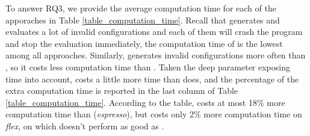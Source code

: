 
To answer RQ3, we provide the average computation time for each of the apporaches in Table \ref{table_computation_time}. Recall that \dr{} generates and evaluates a lot of invalid configurations and each of them will crash the program and stop the evaluation immediately, the computation time of \dr{} is the lowest among all approaches. Similarly, \dn{} generates invalid configurations more often than \sn{}, so it costs less computation time than \sn{}. Taken the deep parameter exposing time into account, \dn{} costs a little more time than \sn{} does, and the percentage of the extra computation time is reported in the last column of Table \ref{table_computation_time}. According to the table, \dn{} costs at most 18\% more computation time than \sn{} (\emph{espresso}), but costs only 2\% more computation time on \emph{flex}, on which \dn{} doesn't perform as good as \sn{}. 


